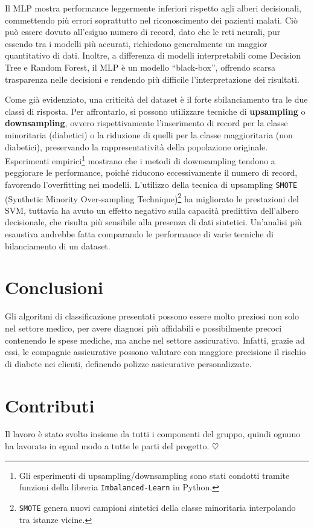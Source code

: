 \documentclass[conference]{IEEEtran}
\begin{document}
 Il MLP mostra performance leggermente inferiori rispetto agli alberi decisionali, commettendo più errori  soprattutto nel riconoscimento dei pazienti malati. Ciò può essere dovuto all’esiguo numero di record, dato che le reti neurali, pur essendo tra i modelli più accurati, richiedono generalmente un maggior quantitativo di dati. 
 Inoltre, a differenza di modelli interpretabili come Decision Tree e Random Forest, il MLP è un modello “black-box”, offrendo scarsa trasparenza nelle decisioni e rendendo più difficile l’interpretazione dei risultati.


Come già evidenziato, una criticità del dataset è il forte sbilanciamento tra le due classi di risposta. Per affrontarlo, si possono utilizzare tecniche di \textbf{upsampling} o \textbf{downsampling}, ovvero rispettivamente l’inserimento di record per la classe minoritaria (diabetici) o la riduzione di quelli per la classe maggioritaria (non diabetici), preservando la rappresentatività della popolazione originale.
Esperimenti empirici\footnote{Gli esperimenti di upsampling/downsampling sono stati condotti tramite funzioni della libreria \texttt{Imbalanced-Learn} in Python.} mostrano che i metodi di downsampling tendono a peggiorare le performance, poiché riducono eccessivamente il numero di record, favorendo l’overfitting nei modelli. L’utilizzo della tecnica di upsampling \texttt{SMOTE} (Synthetic Minority Over-sampling Technique)\footnote{\texttt{SMOTE} genera nuovi campioni sintetici della classe minoritaria interpolando tra istanze vicine.} ha migliorato le prestazioni del SVM, tuttavia ha avuto un effetto negativo sulla capacità predittiva dell’albero decisionale, che risulta più sensibile alla presenza di dati sintetici. Un'analisi più esaustiva andrebbe fatta comparando le performance di varie tecniche di bilanciamento di un dataset.


\section{Conclusioni}
Gli algoritmi di classificazione presentati possono essere molto preziosi non solo nel settore medico, per avere diagnosi più affidabili e possibilmente precoci contenendo le spese mediche, ma anche nel settore assicurativo. Infatti, grazie ad essi, le compagnie assicurative possono valutare con maggiore precisione il rischio di diabete nei clienti, definendo polizze assicurative personalizzate. 

\section{Contributi}
Il lavoro è stato svolto insieme da tutti i componenti del gruppo, quindi ognuno ha lavorato in egual modo a tutte le parti del progetto. $\heartsuit$
\end{document}
